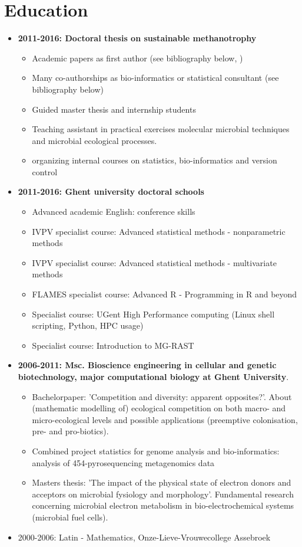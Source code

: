 \documentclass[a4paper,11pt,oneside]{article}
\begin{document}
\section*{Education}
\begin{itemize}
\item \textbf{2011-2016: Doctoral thesis on sustainable methanotrophy}
    \begin{itemize}
      \item Academic papers as first author (see bibliography below, \cite{kerckhof2014optimized})
      \item Many co-authorships as bio-informatics or statistical consultant  (see bibliography below)
      \item Guided master thesis and internship students
      \item Teaching assistant in practical exercises molecular microbial techniques and microbial ecological processes.
      \item organizing internal courses on statistics, bio-informatics and version control
    \end{itemize}
\item \textbf{2011-2016: Ghent university doctoral schools}
    \begin{itemize}
      \item Advanced academic English: conference skills
      \item IVPV specialist course: Advanced statistical methods - nonparametric methods
      \item IVPV specialist course: Advanced statistical methods - multivariate methods
      \item FLAMES specialist course: Advanced R - Programming in R and beyond
      \item Specialist course: UGent High Performance computing (Linux shell scripting, Python, HPC usage)
      \item Specialist course: Introduction to MG-RAST
    \end{itemize}
\item \textbf{2006-2011: Msc. Bioscience engineering in cellular and genetic biotechnology, major computational biology at Ghent University}. 
	\begin{itemize}
		\item Bachelorpaper: 'Competition and diversity: apparent opposites?'. About (mathematic modelling of) ecological competition on both macro- and micro-ecological levels and possible applications (preemptive colonisation, pre- and pro-biotics).
		\item Combined project statistics for genome analysis and bio-informatics: analysis of 454-pyrosequencing metagenomics data
		\item Masters thesis: 'The impact of the physical state of electron donors and acceptors on microbial fysiology and morphology'. Fundamental research concerning microbial electron metabolism in bio-electrochemical systems (microbial fuel cells).
	\end{itemize}
\item 2000-2006: Latin - Mathematics, Onze-Lieve-Vrouwecollege Assebroek
\end{itemize}
\end{document}
